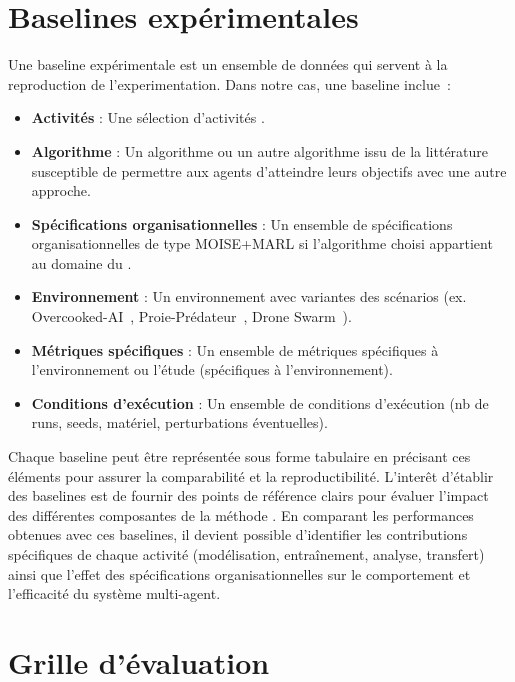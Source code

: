 \section{Baselines expérimentales}

Une baseline expérimentale est un ensemble de données qui servent à la reproduction de l'experimentation. Dans notre cas, une baseline inclue~:
\begin{itemize}
    \item \textbf{Activités} : Une sélection d'activités .
    \item \textbf{Algorithme} : Un algorithme  ou un autre algorithme issu de la littérature susceptible de permettre aux agents d'atteindre leurs objectifs avec une autre approche.
    \item \textbf{Spécifications organisationnelles} : Un ensemble de spécifications organisationnelles de type MOISE+MARL si l'algorithme choisi appartient au domaine du .
    \item \textbf{Environnement} : Un environnement avec variantes des scénarios (ex. Overcooked-AI~\cite{overcookedai}, Proie-Prédateur~\cite{lowe2017multi}, Drone Swarm~\cite{cage_challenge_3_announcement}).
    \item \textbf{Métriques spécifiques} : Un ensemble de métriques spécifiques à l'environnement ou l'étude (spécifiques à l’environnement).
    \item \textbf{Conditions d’exécution} : Un ensemble de conditions d’exécution (nb de runs, seeds, matériel, perturbations éventuelles).
\end{itemize}

Chaque baseline peut être représentée sous forme tabulaire en précisant ces éléments pour assurer la comparabilité et la reproductibilité. L'interêt d'établir des baselines est de fournir des points de référence clairs pour évaluer l'impact des différentes composantes de la méthode . En comparant les performances obtenues avec ces baselines, il devient possible d'identifier les contributions spécifiques de chaque activité (modélisation, entraînement, analyse, transfert) ainsi que l'effet des spécifications organisationnelles sur le comportement et l'efficacité du système multi-agent.

\section{Grille d’évaluation}\label{sec:evaluation_grid}

